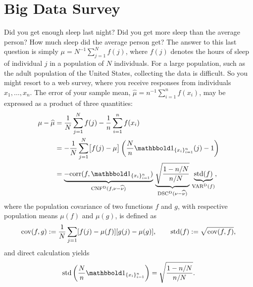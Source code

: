 \documentclass[graybox,footinfo]{svmult}
\DeclareMathOperator{\Cov}{cov}
\DeclareMathOperator{\algn}{CNF}
\DeclareMathOperator{\disc}{DSC}
\DeclareMathOperator{\Var}{VAR}
\begin{document}
\section{Big Data Survey} \label{FJH:sec:sleep} 
Did you get enough sleep last night?  Did you get more sleep than the average person?  
How much sleep did the average person get? The answer to this last question is simply 
$\mu = N^{-1} \sum_{j=1}^N f(j)$, where $f(j)$ denotes the hours of sleep of individual 
$j$ in a population of $N$ individuals.  For a large population, such as the adult 
population of the United States, collecting the data is difficult. So you might resort to a 
web survey, where you receive responses from individuals $x_1, \ldots, x_n$.  The error of 
your sample mean, $\widehat{\mu} = n^{-1} \sum_{i=1}^n f(x_i)$, may be expressed as a 
product of three quantities:
\begin{align}
\nonumber
\mu - \widehat{\mu} 
&= \frac{1}N \sum_{j=1}^N f(j) -  \frac 1n \sum_{i=1}^n f(x_i)  \\
\nonumber
&= - \frac{1}N \sum_{j=1}^N \bigl[ f(j) - \mu \bigr]\left ( \frac Nn \bbone_{\{x_i\}_{i=1}^n}(j) 
- 1 \right) \\
& = \underbrace{-\corr(f, \bbone_{\{x_i\}_{i=1}^n})}_{\algn^\Dt(f,\nu - \hnu)} \,
\underbrace{\sqrt{\frac{1 - n/N}{n/N}}}_{\disc^\Dt(\nu - \hnu)} \, 
\underbrace{\std(f)}_{\Var^\Dt(f)}, 
\label{FJH:eq:surveydettrio}
\end{align}
where the population covariance of two functions $f$ and $g$, with respective 
population means $\mu(f)$ and $\mu(g)$, is defined as 
\begin{equation*}
\Cov(f,g) : = \frac 1N \sum_{j=1} [f(j) - \mu(f)] [g(j) - \mu(g)], \qquad 
\std(f) : = \sqrt{\Cov(f,f)},
\end{equation*}
and direct calculation yields
\begin{equation*}
\std\left(\frac Nn \bbone_{\{x_i\}_{i=1}^n}\right) = \sqrt{\frac{1 - n/N}{n/N}}.
\end{equation*}
\end{document}
